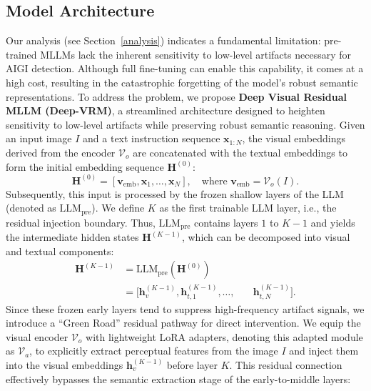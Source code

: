 \documentclass{article}
\theoremstyle{plain}
\theoremstyle{definition}
\theoremstyle{remark}
\begin{document}
\subsection{Model Architecture}
Our analysis (see Section~\ref{analysis}) indicates a fundamental limitation: pre-trained MLLMs lack the inherent sensitivity to low-level artifacts necessary for AIGI detection. 
Although full fine-tuning can enable this capability, it comes at a high cost, resulting in the catastrophic forgetting of the model's robust semantic representations.
To address the problem, we propose \textbf{Deep Visual Residual MLLM (Deep-VRM)}, a streamlined architecture designed to heighten sensitivity to low-level artifacts while preserving robust semantic reasoning. 
Given an input image $I$ and a text instruction sequence $\mathbf{x}_{1:N}$, the visual embeddings derived from the encoder $\mathcal{V}_o$ are concatenated with the textual embeddings to form the initial embedding sequence $\mathbf{H}^{(0)}$:
\begin{equation}
  \mathbf{H}^{(0)} = [\mathbf{v}_{\text{emb}}, \mathbf{x}_1, \dots, \mathbf{x}_N], \quad \text{where } \mathbf{v}_{\text{emb}} = \mathcal{V}_o(I).
  \label{eq:input}
\end{equation}
\noindent
Subsequently, this input is processed by the frozen shallow layers of the LLM (denoted as $\text{LLM}_{\text{pre}}$). We define $K$ as the first trainable LLM layer, i.e., the residual injection boundary. Thus, $\text{LLM}_{\text{pre}}$ contains layers $1$ to $K-1$ and yields the intermediate hidden states $\mathbf{H}^{(K-1)}$, which can be decomposed into visual and textual components:
\begin{equation}
\begin{aligned}
    \mathbf{H}^{(K-1)}
    &= \text{LLM}_{\text{pre}}(\mathbf{H}^{(0)}) \\
    &= \bigl[\mathbf{h}_v^{(K-1)}, \mathbf{h}_{t,1}^{(K-1)}, \dots, 
    &\quad \mathbf{h}_{t,N}^{(K-1)}\bigr].
\end{aligned}
\label{eq:pre_stage}
\end{equation}
Since these frozen early layers tend to suppress high-frequency artifact signals, we introduce a ``Green Road'' residual pathway for direct intervention. 
We equip the visual encoder $\mathcal{V}_o$ with lightweight LoRA adapters, denoting this adapted module as $\mathcal{V}_a$, to explicitly extract perceptual features from the image $I$ and inject them into the visual embeddings $\mathbf{h}_v^{(K-1)}$ before layer $K$. This residual connection effectively bypasses the semantic extraction stage of the early-to-middle layers:
\end{document}
